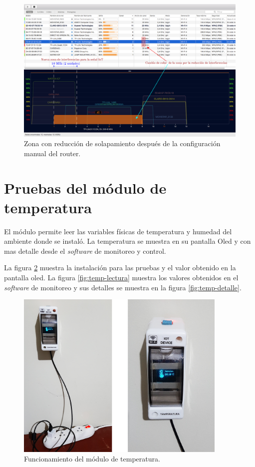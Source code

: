 
\begin{landscape} %
\begin{figure}[htpb]
\centering 
\includegraphics[width=1.5\textwidth]{./Figures/wifi/06.png}
\caption{Zona con reducción de solapamiento después de la configuración manual del router.}
\label{fig:test06}
\end{figure}
\end{landscape} %


\section{Pruebas del módulo de temperatura}

El módulo permite leer las variables físicas de temperatura y humedad del ambiente donde se instaló. La temperatura se muestra en su pantalla Oled y con mas detalle desde el \emph{software} de monitoreo y control.

La figura \ref{fig:test-temp} muestra la instalación para las pruebas y el valor obtenido en la pantalla oled. La figura \ref{fig:temp-lectura} muestra los valores obtenidos en el \emph{software} de monitoreo y sus detalles se muestra en la figura \ref{fig:temp-detalle}.

\begin{figure}[htpb]
\centering 
\includegraphics[width=0.9\textwidth]{./Figures/test/temp/test-temp.png}
\caption{Funcionamiento del módulo de temperatura.}
\label{fig:test-temp}
\end{figure}

